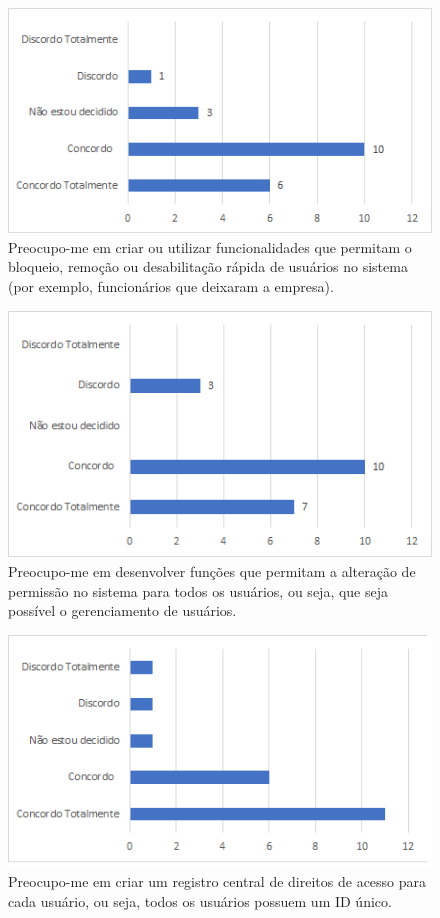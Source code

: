 \begin{figure}[!t]
\centering
\includegraphics[scale=0.8]{figuras das questoes/1.2.PNG}
\caption{Preocupo-me em criar ou utilizar funcionalidades que permitam o bloqueio, remoção ou desabilitação rápida de usuários no sistema (por exemplo, funcionários que deixaram a empresa).}
\end{figure}

\begin{figure}[!t]
\centering
\includegraphics[scale=0.7]{figuras das questoes/1.3.png}
\caption{Preocupo-me em desenvolver funções que permitam a alteração de permissão no
sistema para todos os usuários, ou seja, que seja possível o gerenciamento de usuários.}
\end{figure}

\begin{figure}[!t]
\centering
\includegraphics[scale=0.7]{figuras das questoes/1.4.png}
\caption{Preocupo-me em criar um registro central de direitos de acesso para cada usuário, ou seja, todos os usuários possuem um ID único.}
\end{figure}

